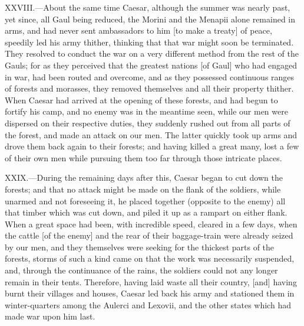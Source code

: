 XXVIII.—About the same time Caesar, although the summer was nearly
past, yet since, all Gaul being reduced, the Morini and the Menapii
alone remained in arms, and had never sent ambassadors to him [to make a
treaty] of peace, speedily led his army thither, thinking that that war
might soon be terminated. They resolved to conduct the war on a very
different method from the rest of the Gauls; for as they perceived that
the greatest nations [of Gaul] who had engaged in war, had been routed
and overcome, and as they possessed continuous ranges of forests and
morasses, they removed themselves and all their property thither. When
Caesar had arrived at the opening of these forests, and had begun to
fortify his camp, and no enemy was in the meantime seen, while our men
were dispersed on their respective duties, they suddenly rushed out from
all parts of the forest, and made an attack on our men. The latter
quickly took up arms and drove them back again to their forests; and
having killed a great many, lost a few of their own men while pursuing
them too far through those intricate places.

XXIX.—During the remaining days after this, Caesar began to cut down
the forests; and that no attack might be made on the flank of the
soldiers, while unarmed and not foreseeing it, he placed together
(opposite to the enemy) all that timber which was cut down, and piled it
up as a rampart on either flank. When a great space had been, with
incredible speed, cleared in a few days, when the cattle [of the enemy]
and the rear of their baggage-train were already seized by our men, and
they themselves were seeking for the thickest parts of the forests,
storms of such a kind came on that the work was necessarily suspended,
and, through the continuance of the rains, the soldiers could not any
longer remain in their tents. Therefore, having laid waste all their
country, [and] having burnt their villages and houses, Caesar led back
his army and stationed them in winter-quarters among the Aulerci and
Lexovii, and the other states which had made war upon him last.


